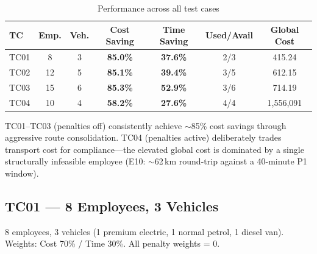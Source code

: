 \documentclass[11pt,a4paper]{article}
\newcommand{\saving}[1]{\textcolor{velgreen}{\textbf{#1}}}
\begin{document}
\begin{table}[H]
\centering
\caption{Performance across all test cases}
\label{tab:overview}
\small
\begin{tabular}{lcccccc}
\toprule
\textbf{TC} & \textbf{Emp.} & \textbf{Veh.} & \textbf{Cost Saving} & \textbf{Time Saving} & \textbf{Used/Avail} & \textbf{Global Cost} \\
\midrule
\rowcolor{rowalt}
TC01 & 8  & 3 & \saving{85.0\%} & \saving{37.6\%} & 2/3 & 415.24 \\
TC02 & 12 & 5 & \saving{85.1\%} & \saving{39.4\%} & 3/5 & 612.15 \\
\rowcolor{rowalt}
TC03 & 15 & 6 & \saving{85.3\%} & \saving{52.9\%} & 3/6 & 714.19 \\
TC04 & 10 & 4 & \saving{58.2\%} & \saving{27.6\%} & 4/4 & 1,556,091 \\
\bottomrule
\end{tabular}
\end{table}

\begin{insightbox}
TC01--TC03 (penalties off) consistently achieve $\sim$85\% cost savings through aggressive route consolidation. TC04 (penalties active) deliberately trades transport cost for compliance---the elevated global cost is dominated by a single structurally infeasible employee (E10: $\sim$62\,km round-trip against a 40-minute P1 window).
\end{insightbox}

\subsection{TC01 --- 8 Employees, 3 Vehicles}

\begin{instancebox}
8 employees, 3 vehicles (1 premium electric, 1 normal petrol, 1 diesel van). Weights: Cost 70\% / Time 30\%. All penalty weights = 0.
\end{instancebox}
\end{document}

